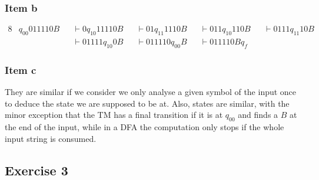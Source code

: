 \documentclass[docid=TP11]{tcom_TP}
\begin{document}
{\begin{minipage}[c]{0.5\textwidth}
\begin{center}
	\end{center}
\end{minipage}
\subsubsection{Item b}
\begin{alignat*}{8}
	& q_{00} 011110B &&\vdash 0 q_{10} 11110B &&\vdash 01 q_{11} 1110B &&\vdash 011 q_{10} 110B &&\vdash 0111 q_{11} 10B \\
	&                &&\vdash 01111 q_{10} 0B &&\vdash 011110 q_{00} B &&\vdash 011110B q_f     &&
\end{alignat*}
\subsubsection{Item c}
They are similar if we consider we only analyse a given symbol of the input once to deduce the state we are supposed to be at. Also, states are similar, with the minor exception that the TM has a final transition if it is at $q_{00}$ and finds a $B$ at the end of the input, while in a DFA the computation only stops if the whole input string is consumed.
\pagebreak
\subsection{Exercise 3}
}
\end{document}
